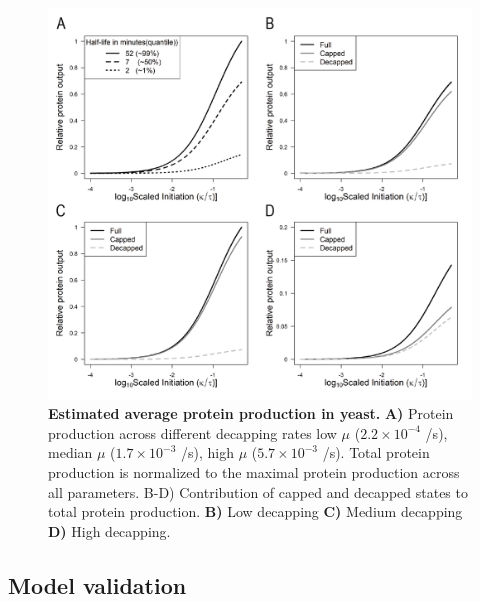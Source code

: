 \documentclass[10pt,letterpaper]{article}
\begin{document}
\begin{figure}[!h]
  \begin{center}
    \includegraphics[width = 120mm]{Images/2023-07-17_Protein_Production_v2.png}
    \caption{{\bf Estimated average protein production in yeast.} {\bf  A)} Protein production across different decapping rates  low $\mu$ ($2.2\times 10^{-4}$ /s), median $\mu$ ($1.7\times 10^{-3}$ /s), high $\mu$ ($5.7\times 10^{-3}$ /s).
      Total protein production is normalized to the maximal protein production across all parameters. B-D) Contribution of capped and decapped states to total protein production. {\bf B)} Low decapping {\bf C)} Medium decapping {\bf D)} High decapping. }
    \label{fig10}
  \end{center}
\end{figure}


\subsection*{Model validation}
\end{document}
